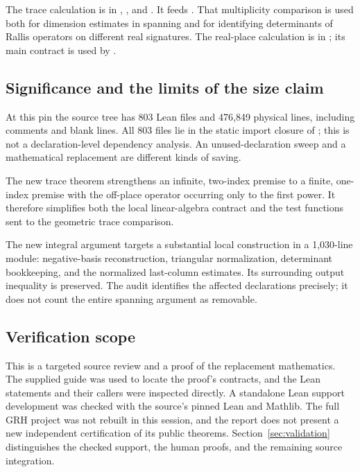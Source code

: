The trace calculation is in
,
, and
.
It feeds
.
That multiplicity comparison is used both for dimension estimates in spanning and
for identifying determinants of Rallis operators on different real signatures.
The real-place calculation is in
; its main contract is
used by .

\subsection{Significance and the limits of the size claim}

At this pin the source tree has 803 Lean files and 476,849 physical lines,
including comments and blank lines. All 803 files lie in the static import closure
of ; this is not a declaration-level dependency analysis.
An unused-declaration sweep and a mathematical replacement are different kinds of saving.

The new trace theorem strengthens an infinite, two-index premise to a finite,
one-index premise with the off-place operator occurring only to the first power.
It therefore simplifies both the local linear-algebra contract and the test functions
sent to the geometric trace comparison.

The new integral argument targets a substantial local construction in a 1,030-line
module: negative-basis reconstruction, triangular normalization, determinant bookkeeping,
and the normalized last-column estimates. Its surrounding output inequality is preserved.
The audit identifies the affected declarations precisely; it does not count the entire
spanning argument as removable.


\subsection{Verification scope}

This is a targeted source review and a proof of the replacement mathematics.
The supplied guide was used to locate the proof's contracts, and the Lean statements
and their callers were inspected directly. A standalone Lean support development
was checked with the source's pinned Lean and Mathlib. The full GRH project was not
rebuilt in this session, and the report does not present a new independent certification
of its public theorems. Section~\ref{sec:validation} distinguishes the checked support,
the human proofs, and the remaining source integration.
